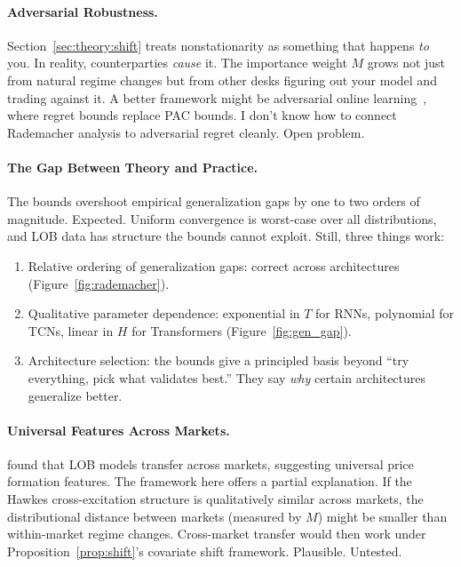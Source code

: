\documentclass[11pt]{article}
\theoremstyle{definition}
\theoremstyle{remark}
\begin{document}
\paragraph{Adversarial Robustness.}
Section~\ref{sec:theory:shift} treats nonstationarity as something that happens \emph{to} you.
In reality, counterparties \emph{cause} it.
The importance weight $M$ grows not just from natural regime changes but from other desks figuring out your model and trading against it.
A better framework might be adversarial online learning~\citep{mohri2018foundations}, where regret bounds replace PAC bounds.
I don't know how to connect Rademacher analysis to adversarial regret cleanly.
Open problem.

\paragraph{The Gap Between Theory and Practice.}
The bounds overshoot empirical generalization gaps by one to two orders of magnitude.
Expected.
Uniform convergence is worst-case over all distributions, and LOB data has structure the bounds cannot exploit.
Still, three things work:
\begin{enumerate}
    \item Relative ordering of generalization gaps: correct across architectures (Figure~\ref{fig:rademacher}).
    \item Qualitative parameter dependence: exponential in $T$ for RNNs, polynomial for TCNs, linear in $H$ for Transformers (Figure~\ref{fig:gen_gap}).
    \item Architecture selection: the bounds give a principled basis beyond ``try everything, pick what validates best.''  They say \emph{why} certain architectures generalize better.
\end{enumerate}

\paragraph{Universal Features Across Markets.}
\citet{sirignano2019universal} found that LOB models transfer across markets, suggesting universal price formation features.
The framework here offers a partial explanation.
If the Hawkes cross-excitation structure is qualitatively similar across markets, the distributional distance between markets (measured by $M$) might be smaller than within-market regime changes.
Cross-market transfer would then work under Proposition~\ref{prop:shift}'s covariate shift framework.
Plausible.
Untested.
\end{document}
